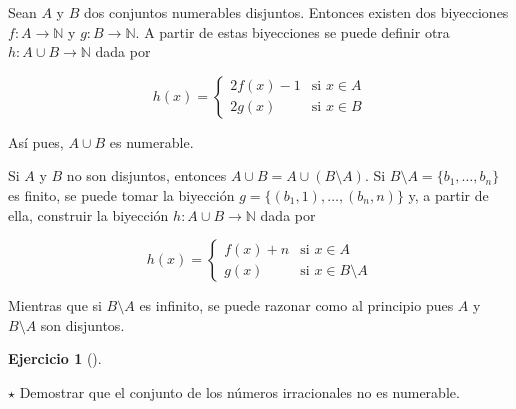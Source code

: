 \documentclass[
  a4paper,
]{scrreport}
\theoremstyle{definition}
\newtheorem{exercise}{Ejercicio}[chapter]
\theoremstyle{remark}
\begin{document}
\begin{tcolorbox}[enhanced jigsaw, colbacktitle=quarto-callout-tip-color!10!white, coltitle=black, arc=.35mm, opacityback=0, breakable, colback=white, bottomtitle=1mm, opacitybacktitle=0.6, rightrule=.15mm, colframe=quarto-callout-tip-color-frame, title=\textcolor{quarto-callout-tip-color}{\faLightbulb}\hspace{0.5em}{Solución}, toptitle=1mm, titlerule=0mm, bottomrule=.15mm, left=2mm, leftrule=.75mm, toprule=.15mm]

Sean \(A\) y \(B\) dos conjuntos numerables disjuntos. Entonces existen
dos biyecciones \(f:A\to \mathbb{N}\) y \(g:B\to \mathbb{N}\). A partir
de estas biyecciones se puede definir otra \(h:A\cup B\to \mathbb{N}\)
dada por

\[h(x)=
\begin{cases}
2f(x)-1 & \mbox{si } x\in A\\
2g(x) & \mbox{si } x\in B
\end{cases}
\]

Así pues, \(A\cup B\) es numerable.

Si \(A\) y \(B\) no son disjuntos, entonces
\(A\cup B=A\cup (B\setminus A)\). Si
\(B\setminus A=\{b_1,\ldots, b_n\}\) es finito, se puede tomar la
biyección \(g=\{(b_1,1),\ldots,(b_n,n)\}\) y, a partir de ella,
construir la biyección \(h:A\cup B\to \mathbb{N}\) dada por

\[h(x)=
\begin{cases}
f(x)+n & \mbox{si } x\in A\\
g(x) & \mbox{si } x\in B\setminus A
\end{cases}
\]

Mientras que si \(B\setminus A\) es infinito, se puede razonar como al
principio pues \(A\) y \(B\setminus A\) son disjuntos.

\end{tcolorbox}

\leavevmode{}%
\begin{exercise}[]\label{exr-irracionales-no-numerables}

\(\star\) Demostrar que el conjunto de los números irracionales no es
numerable.

\end{exercise}
\end{document}
